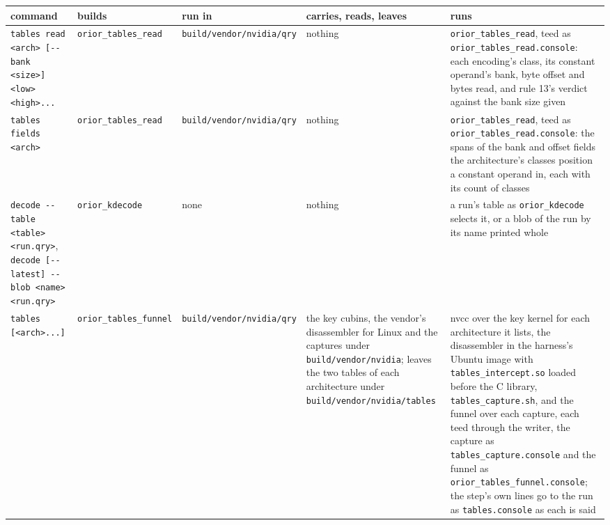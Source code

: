 {\scriptsize
\setlength{\tabcolsep}{4pt}
\begin{longtable}{>{\RaggedRight\arraybackslash}p{}>{\RaggedRight\arraybackslash}p{}>{\RaggedRight\arraybackslash}p{}>{\RaggedRight\arraybackslash}p{}>{\RaggedRight\arraybackslash}p{}}
\toprule
command & builds & run in & carries, reads, leaves & runs \\
\midrule
\endhead
\texttt{tables read <arch> [-\allowbreak{}-\allowbreak{}bank <size>] <low> <high>.\allowbreak{}.\allowbreak{}.\allowbreak{}} & \texttt{orior\_\allowbreak{}tables\_\allowbreak{}read} & \texttt{build/\allowbreak{}vendor/\allowbreak{}nvidia/\allowbreak{}qry} & nothing & \texttt{orior\_\allowbreak{}tables\_\allowbreak{}read}, teed as \texttt{orior\_\allowbreak{}tables\_\allowbreak{}read.\allowbreak{}console}: each encoding's class, its constant operand's bank, byte offset and bytes read, and rule 13's verdict against the bank size given \\
\texttt{tables fields <arch>} & \texttt{orior\_\allowbreak{}tables\_\allowbreak{}read} & \texttt{build/\allowbreak{}vendor/\allowbreak{}nvidia/\allowbreak{}qry} & nothing & \texttt{orior\_\allowbreak{}tables\_\allowbreak{}read}, teed as \texttt{orior\_\allowbreak{}tables\_\allowbreak{}read.\allowbreak{}console}: the spans of the bank and offset fields the architecture's classes position a constant operand in, each with its count of classes \\
\texttt{decode -\allowbreak{}-\allowbreak{}table <table> <run.\allowbreak{}qry>}, \texttt{decode [-\allowbreak{}-\allowbreak{}latest] -\allowbreak{}-\allowbreak{}blob <name> <run.\allowbreak{}qry>} & \texttt{orior\_\allowbreak{}kdecode} & none & nothing & a run's table as \texttt{orior\_\allowbreak{}kdecode} selects it, or a blob of the run by its name printed whole \\
\texttt{tables [<arch>.\allowbreak{}.\allowbreak{}.\allowbreak{}]} & \texttt{orior\_\allowbreak{}tables\_\allowbreak{}funnel} & \texttt{build/\allowbreak{}vendor/\allowbreak{}nvidia/\allowbreak{}qry} & the key cubins, the vendor's disassembler for Linux and the captures under \texttt{build/\allowbreak{}vendor/\allowbreak{}nvidia}; leaves the two tables of each architecture under \texttt{build/\allowbreak{}vendor/\allowbreak{}nvidia/\allowbreak{}tables} & nvcc over the key kernel for each architecture it lists, the disassembler in the harness's Ubuntu image with \texttt{tables\_\allowbreak{}intercept.\allowbreak{}so} loaded before the C library, \texttt{tables\_\allowbreak{}capture.\allowbreak{}sh}, and the funnel over each capture, each teed through the writer, the capture as \texttt{tables\_\allowbreak{}capture.\allowbreak{}console} and the funnel as \texttt{orior\_\allowbreak{}tables\_\allowbreak{}funnel.\allowbreak{}console}; the step's own lines go to the run as \texttt{tables.\allowbreak{}console} as each is said \\

\end{longtable}}
